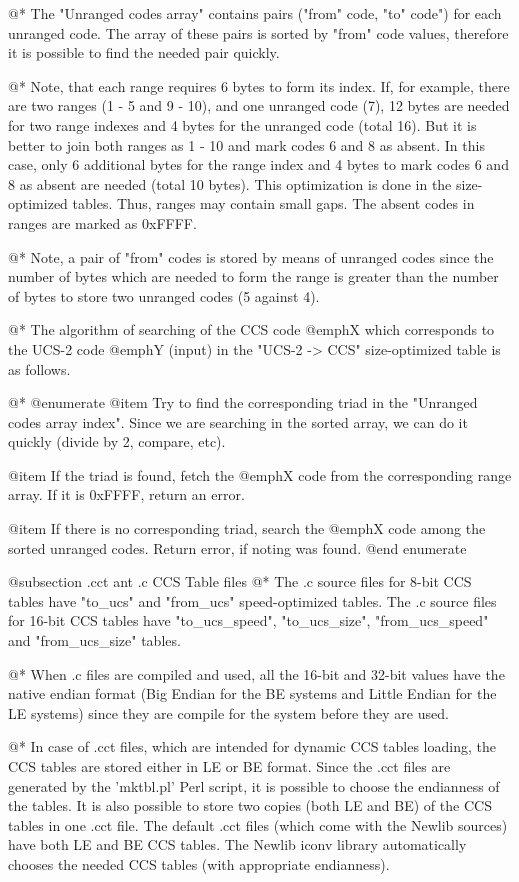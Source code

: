 @*
The "Unranged codes array" contains pairs ("from" code, "to" code") for
each unranged code. The array of these pairs is sorted by "from" code
values, therefore it is possible to find the needed pair quickly.

@*
Note, that each range requires 6 bytes to form its index. If, for
example, there are two ranges (1 - 5 and 9 - 10), and one unranged code
(7), 12 bytes are needed for two range indexes and 4 bytes for the unranged
code (total 16). But it is better to join both ranges as 1 - 10 and
mark codes 6 and 8 as absent. In this case, only 6 additional bytes for the
range index and 4 bytes to mark codes 6 and 8 as absent are needed
(total 10 bytes). This optimization is done in the size-optimized tables.
Thus, ranges may contain small gaps. The absent codes in ranges are marked
as 0xFFFF.

@*
Note, a pair of "from" codes is stored by means of unranged codes since
the number of bytes which are needed to form the range is greater than
the number of bytes to store two unranged codes (5 against 4).

@*
The algorithm of searching of the CCS code
@emph{X} which corresponds to the UCS-2 code @emph{Y} (input) in the "UCS-2 ->
CCS" size-optimized table is as follows.

@*
@enumerate
@item Try to find the corresponding triad in the "Unranged codes array
index". Since we are searching in the sorted array, we can do it quickly
(divide by 2, compare, etc).

@item If the triad is found, fetch the @emph{X} code from the corresponding
range array. If it is 0xFFFF, return an error.

@item If there is no corresponding triad, search the @emph{X} code among the
sorted unranged codes. Return error, if noting was found.
@end enumerate

@subsection .cct ant .c CCS Table files
@*
The .c source files for 8-bit CCS tables have "to_ucs" and "from_ucs"
speed-optimized tables. The .c source files for 16-bit CCS tables have
"to_ucs_speed", "to_ucs_size", "from_ucs_speed" and "from_ucs_size"
tables.

@*
When .c files are compiled and used, all the 16-bit and 32-bit values
have the native endian format (Big Endian for the BE systems and Little
Endian for the LE systems) since they are compile for the system before
they are used.

@*
In case of .cct files, which are intended for dynamic CCS tables
loading, the CCS tables are stored either in LE or BE format. Since the
.cct files are generated by the 'mktbl.pl' Perl script, it is possible
to choose the endianness of the tables. It is also possible to store two
copies (both LE and BE) of the CCS tables in one .cct file. The default
.cct files (which come with the Newlib sources) have both LE and BE CCS
tables. The Newlib iconv library automatically chooses the needed CCS tables
(with appropriate endianness).

